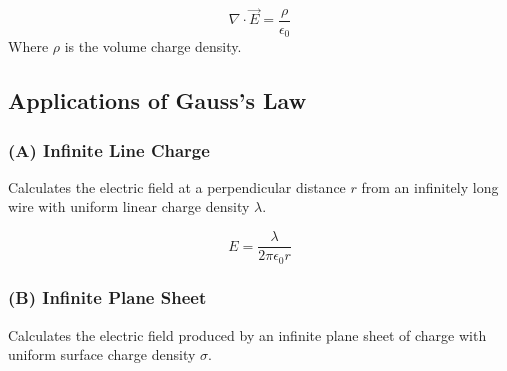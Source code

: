 \documentclass[11pt,a4paper]{article}
\begin{document}
\begin{formulabox}
    \[ \nabla \cdot \vec{E} = \frac{\rho}{\epsilon_0} \]
    Where $\rho$ is the volume charge density.
\end{formulabox}

\subsection{Applications of Gauss's Law}

\subsubsection{(A) Infinite Line Charge}
\begin{pyqbox}
    Calculates the electric field at a perpendicular distance $r$ from an infinitely long wire with uniform linear charge density $\lambda$.
\end{pyqbox}

\begin{center}
\end{center}

\begin{formulabox}
    \[ E = \frac{\lambda}{2\pi\epsilon_0 r} \]
\end{formulabox}

\subsubsection{(B) Infinite Plane Sheet}
\begin{pyqbox}
    Calculates the electric field produced by an infinite plane sheet of charge with uniform surface charge density $\sigma$.
\end{pyqbox}
\end{document}
